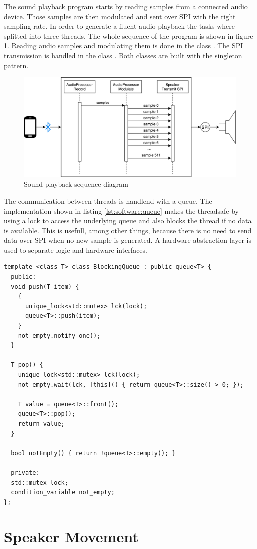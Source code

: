 The sound playback program starts by reading samples from a connected audio device. Those samples are then modulated and sent over SPI with the right sampling rate. In order to generate a fluent audio playback the tasks where splitted into three threads. The whole sequence of the program is shown in figure \ref{fig:software:sound_sequence}.\p
%
Reading audio samples and modulating them is done in the class . The SPI transmission is handled in the class . Both classes are built with the singleton pattern.
%
\begin{figure}
  \centering
  \includegraphics[width=\textwidth]{src/assets/pictures/software/sequence_diagramm.png}
  \caption{Sound playback sequence diagram}\label{fig:software:sound_sequence}
\end{figure}
\p
The communication between threads is handlend with a queue. The implementation shown in listing \ref{lst:software:queue} makes the  threadsafe by using a lock to access the underlying queue and also blocks the thread if no data is available. This is usefull, among other things, because there is no need to send data over SPI when no new sample is generated.\p
%
A hardware abstraction layer is used to separate logic and hardware interfaces.
%
\begin{mdframed}
\begin{lstlisting}[caption=Threadsafe and blocking queue, label=lst:software:queue]
template <class T> class BlockingQueue : public queue<T> {
  public:
  void push(T item) {
    {
      unique_lock<std::mutex> lck(lock);
      queue<T>::push(item);
    }
    not_empty.notify_one();
  }

  T pop() {
    unique_lock<std::mutex> lck(lock);
    not_empty.wait(lck, [this]() { return queue<T>::size() > 0; });

    T value = queue<T>::front();
    queue<T>::pop();
    return value;
  }

  bool notEmpty() { return !queue<T>::empty(); }

  private:
  std::mutex lock;
  condition_variable not_empty;
};
\end{lstlisting}
\end{mdframed}





\section{Speaker Movement}
